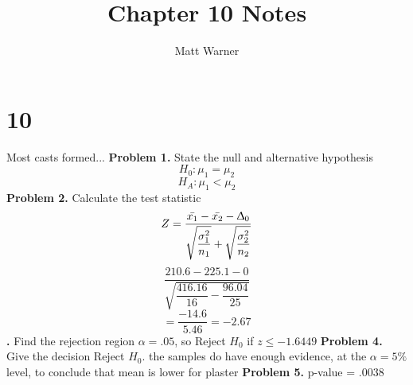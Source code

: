 \documentclass{report}
\title{\Huge{Chapter 10 Notes}}
\author{\huge{Matt Warner}}
\date{\huge{}}
\begin{document}
  \maketitle
  \chapter*{10}
\q
Most casts formed...
\bigbreak \noindent 
\textbf{Problem 1.} State the null and alternative hypothesis
$$ H_0 : \mu_{1} = \mu_{2}$$
$$ H_A : \mu_{1} <\mu_{2}$$
\textbf{Problem 2.} Calculate the test statistic
$$ Z = \dfrac{\bar{x_1}-\bar{x_2} - \Updelta_0}{\sqrt{\dfrac{\sigma_{1}^2}{n_{1}}} +\sqrt{\dfrac{\sigma_{2}^2}{n_{2}}} }$$
$$ \dfrac{210.6 -225.1 - 0}{\sqrt{\dfrac{416.16}{16} - \dfrac{96.04}{25}}}$$
$$ = \dfrac{-14.6}{5.46} = -2.67$$
\textbf{.} Find the rejection region
\bigbreak \noindent
$\alpha = .05$, so
\bigbreak \noindent
Reject $ H_0$ if $ z\leq -1.6449$
\bigbreak \noindent
\textbf{{Problem 4.}} Give the decision
Reject $ H_0$. the samples do have enough evidence, at the $\alpha =5\% $level, to conclude that mean is lower for plaster 
\bigbreak \noindent
\textbf{Problem 5. } p-value = $.0038 $
\end{document}

